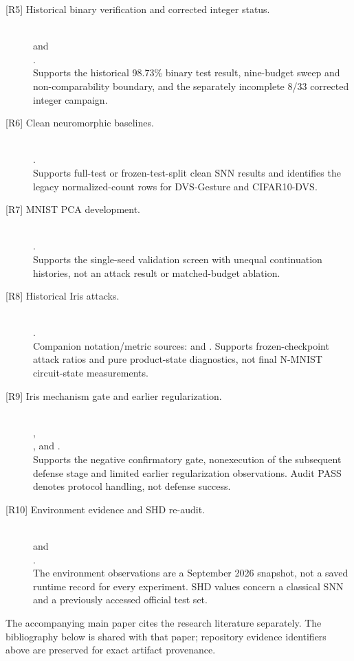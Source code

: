 \documentclass[10pt,onecolumn]{article}
\newcommand{\rref}[1]{\textup{[R#1]}}
\begin{document}
\begin{description}
\item[\rref{5} Historical binary verification and corrected integer status.]\mbox{}\\
 and\\
.\\
Supports the historical 98.73\% binary test result, nine-budget sweep and non-comparability boundary, and the separately incomplete 8/33 corrected integer campaign.

\item[\rref{6} Clean neuromorphic baselines.]\mbox{}\\
.\\
Supports full-test or frozen-test-split clean SNN results and identifies the legacy normalized-count rows for DVS-Gesture and CIFAR10-DVS.

\item[\rref{7} MNIST PCA development.]\mbox{}\\
.\\
Supports the single-seed validation screen with unequal continuation histories, not an attack result or matched-budget ablation.

\item[\rref{8} Historical Iris attacks.]\mbox{}\\
.\\
Companion notation/metric sources:  and . Supports frozen-checkpoint attack ratios and pure product-state diagnostics, not final N-MNIST circuit-state measurements.

\item[\rref{9} Iris mechanism gate and earlier regularization.]\mbox{}\\
,\\
, and .\\
Supports the negative confirmatory gate, nonexecution of the subsequent defense stage and limited earlier regularization observations. Audit PASS denotes protocol handling, not defense success.

\item[\rref{10} Environment evidence and SHD re-audit.]\mbox{}\\
 and\\
.\\
The environment observations are a September 2026 snapshot, not a saved runtime record for every experiment. SHD values concern a classical SNN and a previously accessed official test set.
\end{description}

\noindent The accompanying main paper cites the research literature separately. The bibliography below is shared with that paper; repository evidence identifiers above are preserved for exact artifact provenance.


\end{document}
